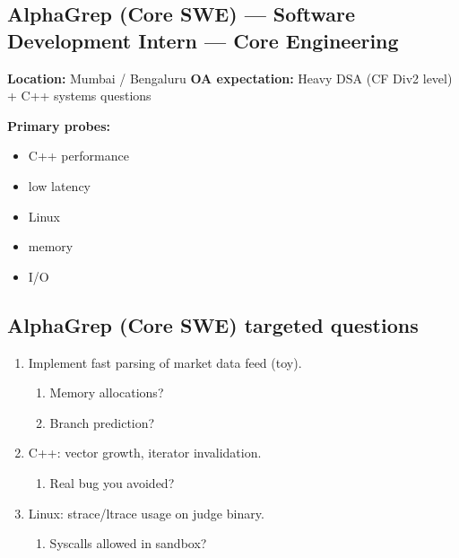 \documentclass[9pt,a4paper]{article}
\begin{document}
\subsection{AlphaGrep (Core SWE) --- Software Development Intern --- Core Engineering}
\textbf{Location:} Mumbai / Bengaluru \quad \textbf{OA expectation:} Heavy DSA (CF Div2 level) + C++ systems questions

\textbf{Primary probes:}
\begin{itemize}
  \item C++ performance
  \item low latency
  \item Linux
  \item memory
  \item I/O
\end{itemize}

\subsection{AlphaGrep (Core SWE) targeted questions}
\begin{enumerate}[label=\textbf{Q\arabic*:}, leftmargin=*]
  \item Implement fast parsing of market data feed (toy).
  \begin{enumerate}[label=\textit{FU\arabic*:}, leftmargin=2em]
    \item Memory allocations?
    \item Branch prediction?
  \end{enumerate}
  \item C++: vector growth, iterator invalidation.
  \begin{enumerate}[label=\textit{FU\arabic*:}, leftmargin=2em]
    \item Real bug you avoided?
  \end{enumerate}
  \item Linux: strace/ltrace usage on judge binary.
  \begin{enumerate}[label=\textit{FU\arabic*:}, leftmargin=2em]
    \item Syscalls allowed in sandbox?
  \end{enumerate}
\end{enumerate}
\end{document}
